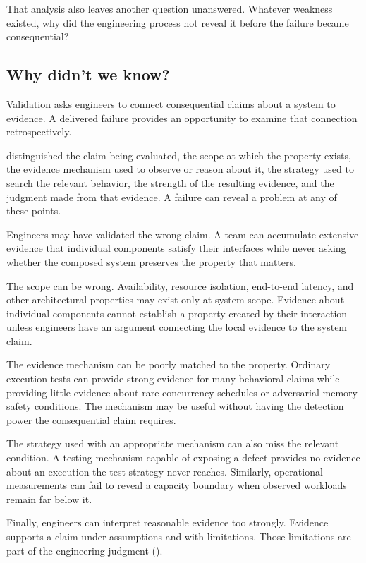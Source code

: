 That analysis also leaves another question unanswered. Whatever weakness existed, why did the
engineering process not reveal it before the failure became consequential?

\subsection{Why didn't we know?}\label{sec-why-didnt-we-know}

Validation asks engineers to connect consequential claims about a system to evidence. A delivered
failure provides an opportunity to examine that connection retrospectively.

\citet{ch-validation} distinguished the claim being evaluated, the scope at which the property exists, the
evidence mechanism used to observe or reason about it, the strategy used to search the relevant
behavior, the strength of the resulting evidence, and the judgment made from that evidence. A
failure can reveal a problem at any of these points.

Engineers may have validated the wrong claim. A team can accumulate extensive evidence that
individual components satisfy their interfaces while never asking whether the composed system
preserves the property that matters.

The scope can be wrong. Availability, resource isolation, end-to-end latency, and other
architectural properties may exist only at system scope. Evidence about individual components
cannot establish a property created by their interaction unless engineers have an argument
connecting the local evidence to the system claim.

The evidence mechanism can be poorly matched to the property. Ordinary execution tests can provide
strong evidence for many behavioral claims while providing little evidence about rare concurrency
schedules or adversarial memory-safety conditions. The mechanism may be useful without having the
detection power the consequential claim requires.

The strategy used with an appropriate mechanism can also miss the relevant condition. A testing
mechanism capable of exposing a defect provides no evidence about an execution the test strategy
never reaches. Similarly, operational measurements can fail to reveal a capacity boundary when
observed workloads remain far below it.

Finally, engineers can interpret reasonable evidence too strongly. Evidence supports a claim under
assumptions and with limitations. Those limitations are part of the engineering judgment
(\citet{sec-strength-of-evidence}).

